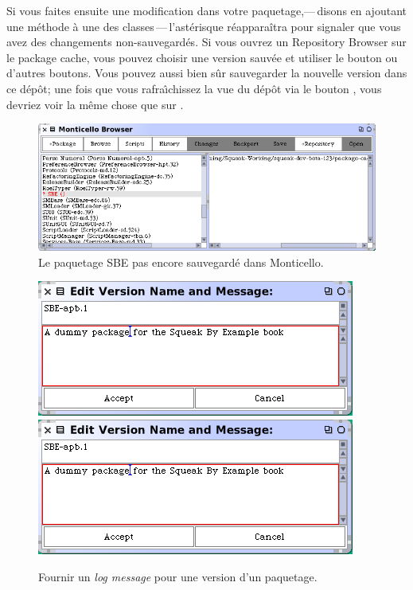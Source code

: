 \documentclass[a4paper,10pt,twoside]{book}
\begin{document}
Si vous faites ensuite une modification dans votre paquetage,---\,disons
en ajoutant une m\'ethode \`a une des classes\,---\,l'ast\'erisque r\'eappara\^itra pour signaler que vous avez des changements non-sauvegard\'es.
Si vous ouvrez un Repository Browser sur le package cache, vous
pouvez choisir une version sauv\'ee et utiliser le bouton 
ou d'autres boutons.
Vous pouvez aussi bien s\^ur sauvegarder la nouvelle version dans
ce d\'ep\^ot; une fois que vous rafra\^{\i}chissez la vue
du d\'ep\^ot via le bouton , vous devriez voir
la m\^eme chose que sur
.

\begin{figure}[tbp]
	\begin{center}
		\includegraphics[width=\textwidth]{MC+SBE}
	\end{center}
	\caption{Le paquetage SBE pas encore sauvegard\'e dans Monticello.}
	\label{fig:MC+SBE}
\end{figure}

\begin{figure}[tbp]
	\begin{center}
	\ifluluelse
		{\includegraphics[width=\textwidth]{SBE-apb}}
		{\includegraphics[scale=0.7]{SBE-apb}}
	\end{center}
	\caption{Fournir un \emph{log message} pour une version d'un paquetage.}
	\label{fig:SBE-apb}
\end{figure}
\end{document}
